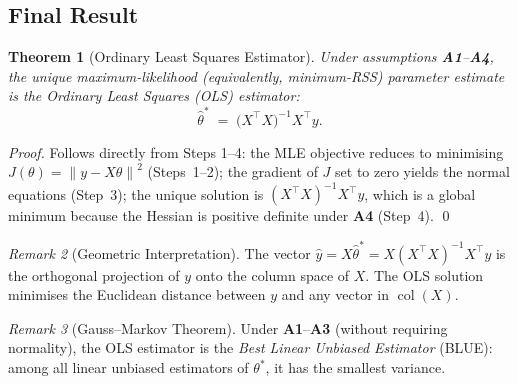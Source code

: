 \documentclass[11pt]{article}
\newtheorem{theorem}{Theorem}[section]
\theoremstyle{definition}
\theoremstyle{remark}
\newtheorem{remark}[theorem]{Remark}
\newcommand{\norm}[1]{\left\lVert#1\right\rVert}
\newcommand{\T}{^{\top}}
\begin{document}
\subsection{Final Result}

\begin{theorem}[Ordinary Least Squares Estimator]
    Under assumptions \textbf{A1}--\textbf{A4}, the unique maximum-likelihood
    (equivalently, minimum-RSS) parameter estimate is the
    \emph{Ordinary Least Squares} (OLS) estimator:
    \[
        \hat{\theta}^{*}
        \;=\;
        \bigl(X\T X\bigr)^{-1} X\T y.
    \]
\end{theorem}

\begin{proof}
    Follows directly from Steps 1--4: the MLE objective reduces to minimising
    $J(\theta) = \norm{y - X\theta}^{2}$ (Steps~1--2); the gradient of $J$ set
    to zero yields the normal equations (Step~3); the unique solution is
    $(X\T X)^{-1}X\T y$, which is a global minimum because the Hessian is
    positive definite under \textbf{A4} (Step~4). \qed
\end{proof}

\begin{remark}[Geometric Interpretation]
    The vector $\hat{y} = X\hat{\theta}^{*} = X(X\T X)^{-1}X\T y$ is the
    orthogonal projection of $y$ onto the column space of $X$.  The OLS
    solution minimises the Euclidean distance between $y$ and any vector in
    $\operatorname{col}(X)$.
\end{remark}

\begin{remark}[Gauss--Markov Theorem]
    Under \textbf{A1}--\textbf{A3} (without requiring normality), the OLS
    estimator is the \emph{Best Linear Unbiased Estimator} (BLUE): among all
    linear unbiased estimators of $\theta^{*}$, it has the smallest variance.
\end{remark}

\end{document}
